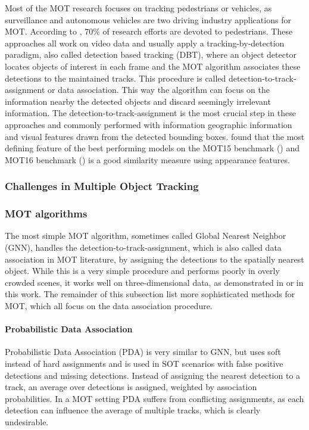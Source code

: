 \documentclass[12pt,a4paper]{article}
\begin{document}
Most of the MOT research focuses on tracking pedestrians or vehicles, as surveillance and autonomous vehicles are two driving industry applications for MOT. According to \cite{mot_lit_rev}, 70\% of research efforts are devoted to pedestrians. These approaches all work on video data and usually apply a tracking-by-detection paradigm, also called detection based tracking (DBT), where an object detector locates objects of interest in each frame and the MOT algorithm associates these detections to the maintained tracks. This procedure is called detection-to-track-assignment or data association. This way the algorithm can focus on the information nearby the detected objects and discard seemingly irrelevant information. The detection-to-track-assignment is the most crucial step in these approaches and commonly performed with information geographic information and visual features drawn from the detected bounding boxes. \cite{tracking_the_trackers} found  that the most defining feature of the best performing models on the MOT15 benchmark (\cite{MOT15}) and MOT16 benchmark (\cite{MOT16}) is a good similarity measure using appearance features.

\subsubsection{Challenges in Multiple Object Tracking}

\subsubsection{MOT algorithms}
\label{mot_algorithms}
The most simple MOT algorithm, sometimes called Global Nearest Neighbor (GNN), handles the detection-to-track-assignment, which is also called data association in MOT literature, by assigning the detections to the spatially nearest object. While this is a very simple procedure and performs poorly in overly crowded scenes, it works well on three-dimensional data, as demonstrated in \cite{3d_kalman} or in this work. The remainder of this subsection list more sophisticated methods for MOT, which all focus on the data association procedure. \\ %

\paragraph{Probabilistic Data Association} Probabilistic Data Association (PDA) is very similar to GNN, but uses soft instead of hard assignments and is used in SOT scenarios with false positive detections and missing detections. Instead of assigning the nearest detection to a track, an average over detections is assigned, weighted by association probabilities. In a MOT setting PDA suffers from conflicting assignments, as each detection can influence the average of multiple tracks, which is clearly undesirable.
\end{document}
